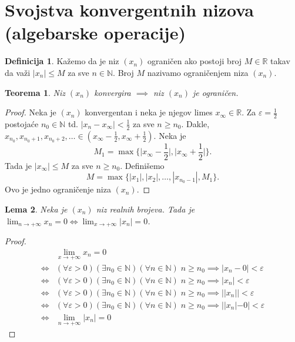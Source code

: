 \documentclass[a4paper,12pt]{article}
\theoremstyle{plain}
\newtheorem{theorem}{Teorema}[section]
\newtheorem{lemma}[theorem]{Lema}
\theoremstyle{definition}
\newtheorem{definition}{Definicija}[section]
\theoremstyle{remark}
\begin{document}
\section{Svojstva konvergentnih nizova (algebarske operacije)}
\begin{definition}
    Kažemo da je niz $(x_n)$ ograničen ako postoji broj $M \in \mathbb{R}$ takav da važi $|x_n| \leq M$ za sve $n \in \mathbb{N}$. Broj $M$ nazivamo ograničenjem niza $(x_n)$.
\end{definition}
\begin{theorem}
    Niz $(x_n)$ konvergira $\implies$ niz $(x_n)$ je ograničen.
\end{theorem}
\begin{proof}
    Neka je $(x_n)$ konvergentan i neka je njegov limes $x_\infty \in \mathbb{R}$. Za $\varepsilon = \frac{1}{2}$ postojaće $n_0 \in \mathbb{N}$ td. $|x_n - x_\infty| < \frac{1}{2}$ za sve $n \geq n_0$. 
    Dakle, $x_{n_0}, x_{n_0 + 1}, x_{n_0 + 2}, \ldots \in (x_\infty - \frac{1}{2}, x_\infty + \frac{1}{2})$.  Neka je
    \[ M_1 = \max \bigg\{ \bigg|x_\infty - \frac{1}{2}\bigg|, \bigg|x_\infty + \frac{1}{2}\bigg|  \bigg\}. \]
    Tada je $|x_\infty| \leq M$ za sve $n \geq n_0$. Definišemo 
    \[ M = \max \{ |x_1|, |x_2|, \ldots, |x_{n_0-1}|, M_1 \}. \]
    Ovo je jedno ograničenje niza $(x_n)$.
\end{proof}
\newpage
\begin{lemma}
    Neka je $(x_n)$ niz realnih brojeva. Tada je $\lim_{n \to +\infty}x_n = 0 \iff \lim_{x \to +\infty}|x_n| = 0$.
\end{lemma}
\begin{proof}
    \[
        \begin{aligned}
            &\lim_{x \to +\infty} x_n = 0 \\
            \iff &(\forall \varepsilon > 0)(\exists n_0 \in \mathbb{N})(\forall n \in \mathbb{N}) \; n \geq n_0 \implies |x_n - 0| < \varepsilon \\
            \iff &(\forall \varepsilon > 0)(\exists n_0 \in \mathbb{N})(\forall n \in \mathbb{N}) \; n \geq n_0 \implies |x_n| < \varepsilon \\
            \iff &(\forall \varepsilon > 0)(\exists n_0 \in \mathbb{N})(\forall n \in \mathbb{N}) \; n \geq n_0 \implies ||x_n||< \varepsilon \\
            \iff &(\forall \varepsilon > 0)(\exists n_0 \in \mathbb{N})(\forall n \in \mathbb{N}) \; n \geq n_0 \implies ||x_n| - 0| < \varepsilon \\
            \iff &\lim_{n \to +\infty} |x_n| = 0
        \end{aligned}
    \]
\end{proof}
\end{document}
